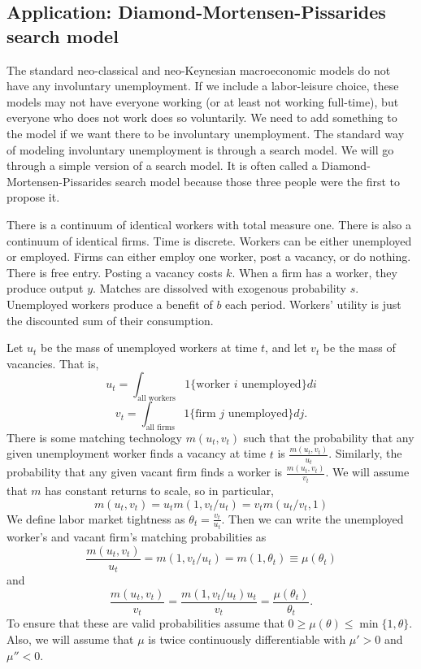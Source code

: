 \documentclass[12pt,reqno]{amsart}
\theoremstyle{definition}
\begin{document}
\subsection{Application: Diamond-Mortensen-Pissarides search model}

The standard neo-classical and neo-Keynesian macroeconomic models do
not have any involuntary unemployment. If we include a labor-leisure
choice, these models may not have everyone working (or at least not
working full-time), but everyone who does not work does so
voluntarily. We need to add something to the model if we want there to
be involuntary unemployment. The standard way of modeling
involuntary unemployment is through a search model. We will go through
a simple version of a search model. It is often called a
Diamond-Mortensen-Pissarides search model because those three people
were the first to propose it. 

There is a continuum of identical workers with total measure
one. There is also a continuum of identical firms. Time is
discrete. Workers can be either unemployed or employed. Firms can
either employ one worker, post a vacancy, or do nothing. There is free
entry. Posting a vacancy costs $k$. When a firm has a worker, they
produce output $y$. Matches are dissolved with exogenous probability
$s$. Unemployed workers produce a benefit of $b$ each period. Workers'
utility is just the discounted sum of their consumption.

Let $u_t$ be the mass of unemployed workers at time $t$, and let $v_t$
be the mass of vacancies. That is,
\[ u_t = \int_{\text{all workers}} 1\{\text{worker $i$ unemployed}\} di \]
\[ v_t = \int_{\text{all firms}} 1\{\text{firm $j$ unemployed}\} dj. \]
There is some matching technology $m(u_t,v_t)$ such that the
probability that any given unemployment worker finds a vacancy at time
$t$ is $\frac{m(u_t,v_t)}{u_t}$. Similarly, the probability that any
given vacant firm finds a worker is $\frac{m(u_t,v_t)}{v_t}$. We will
assume that $m$ has constant returns to scale, so in particular,
\[ m(u_t,v_t) = u_t m(1,v_t/u_t) = v_t m(u_t/v_t,1) \]
We define labor market tightness as $\theta_t = \frac{v_t}{u_t}$. Then
we can write the unemployed worker's and vacant firm's matching
probabilities as 
\[ \frac{m(u_t,v_t)}{u_t} = m(1,v_t/u_t) = m(1,\theta_t) \equiv
\mu(\theta_t) \]
and 
\[ \frac{m(u_t,v_t)}{v_t} = \frac{m(1,v_t/u_t)u_t}{v_t} =
\frac{\mu(\theta_t)}{\theta_t}. \] 
To ensure that these are valid probabilities assume that $0 \geq \mu(\theta)
\leq \min\{1,\theta\}$. Also, we will assume that $\mu$ is twice
continuously differentiable with $\mu'>0$ and $\mu''<0$. 
\end{document}
